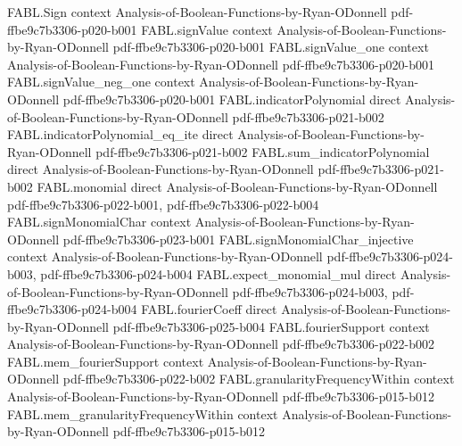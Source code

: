 \begin{theorem}
\label{FABL.noiseStability_majority_odd_antitone}
\leanok
{}
\proofstep
  {FABL.Sign}
  {context}
  {Analysis-of-Boolean-Functions-by-Ryan-ODonnell}
  {pdf-ffbe9c7b3306-p020-b001}
\proofstep
  {FABL.signValue}
  {context}
  {Analysis-of-Boolean-Functions-by-Ryan-ODonnell}
  {pdf-ffbe9c7b3306-p020-b001}
\proofstep
  {FABL.signValue_one}
  {context}
  {Analysis-of-Boolean-Functions-by-Ryan-ODonnell}
  {pdf-ffbe9c7b3306-p020-b001}
\proofstep
  {FABL.signValue_neg_one}
  {context}
  {Analysis-of-Boolean-Functions-by-Ryan-ODonnell}
  {pdf-ffbe9c7b3306-p020-b001}
\proofstep
  {FABL.indicatorPolynomial}
  {direct}
  {Analysis-of-Boolean-Functions-by-Ryan-ODonnell}
  {pdf-ffbe9c7b3306-p021-b002}
\proofstep
  {FABL.indicatorPolynomial_eq_ite}
  {direct}
  {Analysis-of-Boolean-Functions-by-Ryan-ODonnell}
  {pdf-ffbe9c7b3306-p021-b002}
\proofstep
  {FABL.sum_indicatorPolynomial}
  {direct}
  {Analysis-of-Boolean-Functions-by-Ryan-ODonnell}
  {pdf-ffbe9c7b3306-p021-b002}
\proofstep
  {FABL.monomial}
  {direct}
  {Analysis-of-Boolean-Functions-by-Ryan-ODonnell}
  {pdf-ffbe9c7b3306-p022-b001,
    pdf-ffbe9c7b3306-p022-b004}
\proofstep
  {FABL.signMonomialChar}
  {context}
  {Analysis-of-Boolean-Functions-by-Ryan-ODonnell}
  {pdf-ffbe9c7b3306-p023-b001}
\proofstep
  {FABL.signMonomialChar_injective}
  {context}
  {Analysis-of-Boolean-Functions-by-Ryan-ODonnell}
  {pdf-ffbe9c7b3306-p024-b003,
    pdf-ffbe9c7b3306-p024-b004}
\proofstep
  {FABL.expect_monomial_mul}
  {direct}
  {Analysis-of-Boolean-Functions-by-Ryan-ODonnell}
  {pdf-ffbe9c7b3306-p024-b003,
    pdf-ffbe9c7b3306-p024-b004}
\proofstep
  {FABL.fourierCoeff}
  {direct}
  {Analysis-of-Boolean-Functions-by-Ryan-ODonnell}
  {pdf-ffbe9c7b3306-p025-b004}
\proofstep
  {FABL.fourierSupport}
  {context}
  {Analysis-of-Boolean-Functions-by-Ryan-ODonnell}
  {pdf-ffbe9c7b3306-p022-b002}
\proofstep
  {FABL.mem_fourierSupport}
  {context}
  {Analysis-of-Boolean-Functions-by-Ryan-ODonnell}
  {pdf-ffbe9c7b3306-p022-b002}
\proofstep
  {FABL.granularityFrequencyWithin}
  {context}
  {Analysis-of-Boolean-Functions-by-Ryan-ODonnell}
  {pdf-ffbe9c7b3306-p015-b012}
\proofstep
  {FABL.mem_granularityFrequencyWithin}
  {context}
  {Analysis-of-Boolean-Functions-by-Ryan-ODonnell}
  {pdf-ffbe9c7b3306-p015-b012}

\end{theorem}

